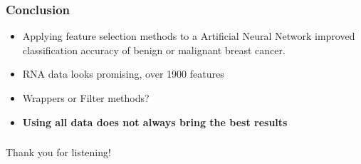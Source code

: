 \documentclass[aspectratio=1610]{beamer}
\begin{document}
\begin{frame}
  \frametitle{\hfill Conclusion}
  \begin{itemize}
  \item Applying feature selection methods to a Artificial Neural Network improved classification accuracy of benign or malignant breast cancer. \\ \pause

  \item RNA data looks promising, over 1900 features \\ \pause

  \item Wrappers or Filter methods? \\ \pause

  \item \textbf{Using all data does not always bring the best results}

  \end{itemize}
\end{frame}

\begin{frame}
  \frametitle{\hfill }
  Thank you for listening!
\end{frame}
\end{document}
